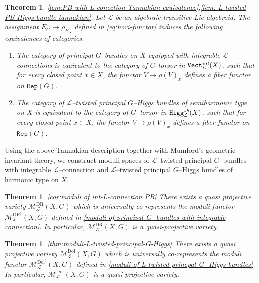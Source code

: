 \documentclass[12pt,reqno]{amsart}
\numberwithin{equation}{subsection}
\newtheorem{thm}[equation]{Theorem}
\theoremstyle{definition}
\theoremstyle{theorem}
\begin{document}
\begin{thm}\eqref{lem:PB-with-L-conection-Tannakian equivalence},\eqref{lem: L-twisted PB-Higgs bundle-tannakian}.
	\label{thm:tannakian-principal-objects}
	Let $\mathcal{L}$ be an algebraic transitive Lie algebroid. The assignment $E_{G}\longmapsto \rho_{E_{G}}$ defined in
	\eqref{eq:nori-functor} induces the following equivalences of categories.
	\begin{enumerate}
		\item The category of principal $G$--bundles on $X$ equipped with integrable $\mathcal{L}$--connections is equivalent to the category of $G$ torsor in $\texttt{Vect}^{\emph{int}}_{\mathcal{L}}(X)$,
		such that for every closed point $x\in X$, the functor $
		V\longmapsto \rho(V)_{x}$ defines a fiber functor on $\texttt{Rep}(G)$.
		
		\item The category of $\mathcal{L}$--twisted principal $G$--Higgs bundles of semiharmonic type on $X$ is equivalent to the category of $G$--torsor in $\texttt{Higg}^{\emph{sh}}_{\mathcal{L}}(X)$,
		such that for every closed point $x\in X$, the functor $
		V\longmapsto \rho(V)_{x}$  defines a fiber functor on $\texttt{Rep}(G)$.
	\end{enumerate}
\end{thm}


Using the above Tannakian description together with Mumford’s geometric invariant theory, we construct moduli spaces of $\mathcal{L}$--twisted principal $G$--bundles with integrable $\mathcal{L}$--connection and $\mathcal{L}$--twisted principal $G$--Higgs bundles of harmonic type on $X$.

\begin{thm}\eqref{cor:moduli of int-L-connection PB}
	There exists a quasi projective variety $\mathcal{M}^{\text{DR}}_{\mathcal{L}}(X,G)$ which is universally co-represents the moduli functor $\mathcal{M}^{\text{DR}^{\natural}}_{\mathcal{L}}(X,G)$ defined in \eqref{moduli of principal G- bundles with integrable connection}. 
	In particular, $\mathcal{M}^{\text{DR}}_{\mathcal{L}}(X,G)$ is a quasi-projective variety.
\end{thm}

\begin{thm}\eqref{thm:moduli-L-twisted-principal-G-Higgs}
	There exists a quasi projective variety $\mathcal{M}^{\text{Dol}}_{\mathcal{L}}(X,G)$ which is universally co-represents the moduli functor $\mathcal{M}^{\text{Dol}^{\natural}}_{\mathcal{L}}(X,G)$ defined in \eqref{moduli-of-L-twisted princpal G--Higgs bundles}. 
	In particular, $\mathcal{M}^{\text{Dol}}_{\mathcal{L}}(X,G)$ is a quasi-projective variety.
\end{thm}
\end{document}
